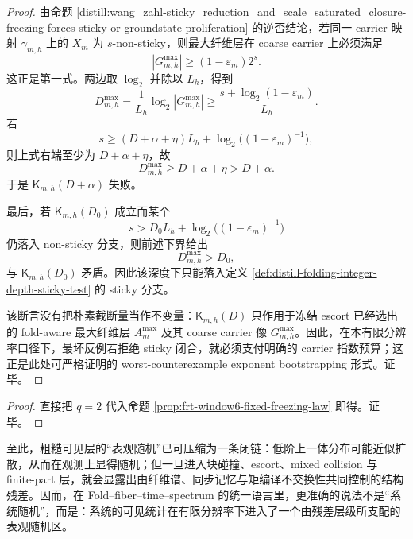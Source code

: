 \begin{proof}
由命题 \ref{distill:wang_zahl-sticky_reduction_and_scale_saturated_closure-freezing-forces-sticky-or-groundstate-proliferation} 的逆否结论，若同一 carrier 映射 \(\gamma_{m,h}\) 上的 \(X_m\) 为 \(s\)-non-sticky，则最大纤维层在 coarse carrier 上必须满足
\[
|G_{m,h}^{\max}|\ge (1-\varepsilon_m)2^s.
\]
这正是第一式。两边取 \(\log_2\) 并除以 \(L_h\)，得到
\[
D_{m,h}^{\max}
=\frac{1}{L_h}\log_2 |G_{m,h}^{\max}|
\ge
\frac{s+\log_2(1-\varepsilon_m)}{L_h}.
\]
若
\[
s\ge (D+\alpha+\eta)L_h+\log_2\!\bigl((1-\varepsilon_m)^{-1}\bigr),
\]
则上式右端至少为 \(D+\alpha+\eta\)，故
\[
D_{m,h}^{\max}\ge D+\alpha+\eta>D+\alpha.
\]
于是 \(\mathsf K_{m,h}(D+\alpha)\) 失败。

最后，若 \(\mathsf K_{m,h}(D_0)\) 成立而某个
\[
s>D_0L_h+\log_2\!\bigl((1-\varepsilon_m)^{-1}\bigr)
\]
仍落入 non-sticky 分支，则前述下界给出
\[
D_{m,h}^{\max}>
D_0,
\]
与 \(\mathsf K_{m,h}(D_0)\) 矛盾。因此该深度下只能落入定义 \ref{def:distill-folding-integer-depth-sticky-test} 的 sticky 分支。

该断言没有把朴素截断量当作不变量：\(\mathsf K_{m,h}(D)\) 只作用于冻结 escort 已经选出的 fold-aware 最大纤维层 \(A_m^{\max}\) 及其 coarse carrier 像 \(G_{m,h}^{\max}\)。因此，在本有限分辨率口径下，最坏反例若拒绝 sticky 闭合，就必须支付明确的 carrier 指数预算；这正是此处可严格证明的 worst-counterexample exponent bootstrapping 形式。证毕。
\end{proof}

\begin{proof}
直接把 \(q=2\) 代入命题 \ref{prop:frt-window6-fixed-freezing-law} 即得。证毕。
\end{proof}

\begin{remark}[本段的统计含义]\label{rem:frt-apparent-randomness-summary}
至此，粗糙可见层的“表观随机”已可压缩为一条闭链：低阶上一体分布可能近似扩散，从而在观测上显得随机；但一旦进入块碰撞、escort、mixed collision 与 finite-part 层，就会显露出由纤维谱、同步记忆与矩编译不交换性共同控制的结构残差。因而，在 Fold--fiber--time--spectrum 的统一语言里，更准确的说法不是“系统随机”，而是：系统的可见统计在有限分辨率下进入了一个由残差层级所支配的表观随机区。
\end{remark}
